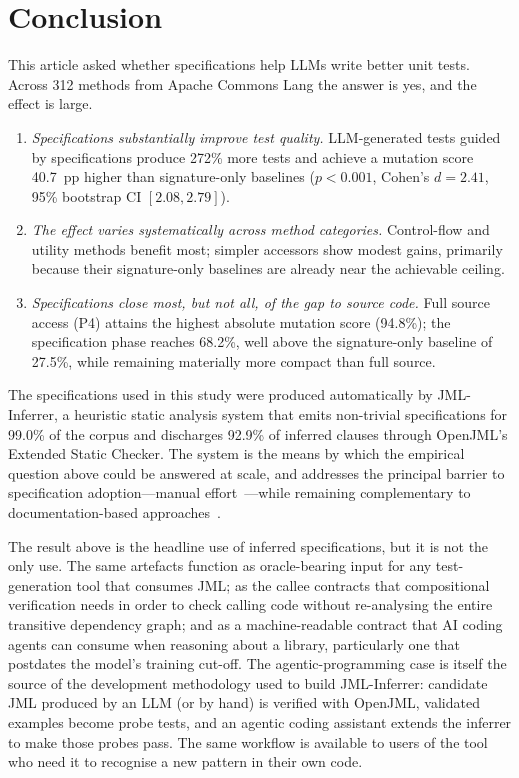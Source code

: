\section{Conclusion}
\label{sec:conclusion}

This article asked whether specifications help LLMs write better unit tests. Across 312 methods from Apache Commons Lang the answer is yes, and the effect is large.

\begin{enumerate}
    \item \emph{Specifications substantially improve test quality.} LLM-generated tests guided by specifications produce 272\% more tests and achieve a mutation score 40.7~pp higher than signature-only baselines ($p < 0.001$, Cohen's $d = 2.41$, 95\% bootstrap CI $[2.08, 2.79]$).

    \item \emph{The effect varies systematically across method categories.} Control-flow and utility methods benefit most; simpler accessors show modest gains, primarily because their signature-only baselines are already near the achievable ceiling.

    \item \emph{Specifications close most, but not all, of the gap to source code.} Full source access (P4) attains the highest absolute mutation score (94.8\%); the specification phase reaches 68.2\%, well above the signature-only baseline of 27.5\%, while remaining materially more compact than full source.
\end{enumerate}

The specifications used in this study were produced automatically by JML-Inferrer, a heuristic static analysis system that emits non-trivial specifications for 99.0\% of the corpus and discharges 92.9\% of inferred clauses through OpenJML's Extended Static Checker. The system is the means by which the empirical question above could be answered at scale, and addresses the principal barrier to specification adoption---manual effort~\cite{zimmermann2019lightweight, hall1990seven}---while remaining complementary to documentation-based approaches~\cite{jdoctor2018}.

The result above is the headline use of inferred specifications, but it is not the only use. The same artefacts function as oracle-bearing input for any test-generation tool that consumes JML; as the callee contracts that compositional verification needs in order to check calling code without re-analysing the entire transitive dependency graph; and as a machine-readable contract that AI coding agents can consume when reasoning about a library, particularly one that postdates the model's training cut-off. The agentic-programming case is itself the source of the development methodology used to build JML-Inferrer: candidate JML produced by an LLM (or by hand) is verified with OpenJML, validated examples become probe tests, and an agentic coding assistant extends the inferrer to make those probes pass. The same workflow is available to users of the tool who need it to recognise a new pattern in their own code.

